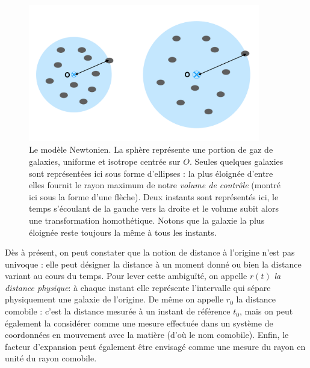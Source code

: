 \begin{figure}[htbp]
	\centering
		\includegraphics[height=6cm]{figs/newton.png}
	\caption[le modèle cosmologique Newtonien]{Le modèle Newtonien. La sphère représente une portion de gaz de galaxies, uniforme et isotrope centrée sur $O$. Seules quelques galaxies sont représentées ici sous forme d'ellipses : la plus éloignée d'entre elles fournit le rayon maximum de notre \textit{volume de contrôle} (montré ici sous la forme d'une flèche). Deux instants sont représentés ici, le temps s'écoulant de la gauche vers la droite et le volume subit alors une transformation homothétique. Notons que la galaxie la plus éloignée reste toujours la même à tous les instants.}
	\label{f:newton}
\end{figure}

Dès à présent, on peut constater que la notion de distance à l'origine n'est pas univoque : elle peut désigner la distance à un moment donné ou bien la distance variant au cours du temps. Pour lever cette ambiguïté, on appelle $r(t)$ \textit{la distance physique}: à chaque instant elle représente l'intervalle qui sépare physiquement une galaxie de l'origine. De même on appelle $r_0$ la distance  comobile : c'est la distance mesurée à un instant de référence $t_0$, mais on peut également la considérer comme une mesure effectuée dans un système de coordonnées en mouvement avec la matière (d'où le nom comobile). Enfin, le facteur d'expansion peut également être envisagé comme une mesure du rayon en unité du rayon comobile.

